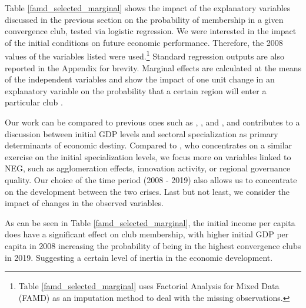 \documentclass[11pt]{article}
\begin{document}
Table \ref{famd_selected_marginal} shows the impact of the explanatory variables discussed in the previous section on the probability of membership in a given convergence club, tested via logistic regression. We were interested in the impact of the initial conditions on future economic performance. Therefore, the 2008 values of the variables listed were used.\footnote{Table \ref{famd_selected_marginal} uses Factorial Analysis for Mixed Data (FAMD) as an imputation method to deal with the missing observations.} Standard regression outputs are also reported in the Appendix for brevity. Marginal effects are calculated at the means of the independent variables and show the impact of one unit change in an explanatory variable on the probability that a certain region will enter a particular club \citep{carrolloglmx}.

Our work can be compared to previous ones such as \citet{cutrini2019economic}, \citet{von2017regional}, and \citet{bartkowska2012regional}, and contributes to a discussion between initial GDP levels and sectoral specialization as primary determinants of economic destiny. Compared to \citet{cutrini2019economic}, who concentrates on a similar exercise on the initial specialization levels, we focus more on variables linked to NEG, such as agglomeration effects, innovation activity, or regional governance quality. Our choice of the time period (2008 - 2019) also allows us to concentrate on the development between the two crises. Last but not least, we consider the impact of changes in the observed variables. 

As can be seen in Table \ref{famd_selected_marginal}, the initial income per capita does have a significant effect on club membership, with higher initial GDP per capita in 2008 increasing the probability of being in the highest convergence clubs in 2019. Suggesting a certain level of inertia in the economic development.
 
\end{document}
